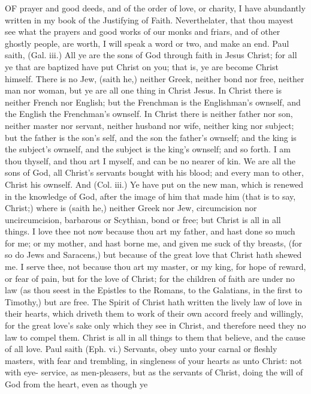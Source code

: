 OF prayer and good deeds, and of the order of love, or 
charity, I have abundantly written in my book of the 
Justifying of Faith. Neverthelater, that thou mayest see 
what the prayers and good works of our monks and friars, 
and of other ghostly people, are worth, I will speak a 
word or two, and make an end. Paul saith, (Gal. iii.) 
All ye are the sons of God through faith in Jesus Christ; 
for all ye that are baptized have put Christ on you; that 
is, ye are become Christ himself. There is no Jew, (saith 
he,) neither Greek, neither bond nor free, neither man nor 
woman, but ye are all one thing in Christ Jesus. In Christ 
there is neither French nor English; but the Frenchman 
is the Englishman's ownself, and the English the Frenchman's
ownself. In Christ there is neither father nor son, 
neither master nor servant, neither husband nor wife, 
neither king nor subject; but the father is the son's self, 
and the son the father's ownself; and the king is the subject's
ownself, and the subject is the king's ownself; and 
so forth. I am thou thyself, and thou art I myself, and can 
be no nearer of kin. We are all the sons of God, all 
Christ's servants bought with his blood; and every man 
to other, Christ his ownself. And (Col. iii.) Ye have put 
on the new man, which is renewed in the knowledge of 
God, after the image of him that made him (that is to say, 
Christ;) where is (saith he,) neither Greek nor Jew, circumcision
nor uncircumcision, barbarous or Scythian, bond 
or free; but Christ is all in all things. I love thee not 
now because thou art my father, and hast done so much 
for me; or my mother, and hast borne me, and given me
suck of thy breasts, (for so do Jews and Saracens,) but 
because of the great love that Christ hath shewed me. I 
serve thee, not because thou art my master, or my king, 
for hope of reward, or fear of pain, but for the love of 
Christ; for the children of faith are under no law (as 
thou seest in the Epistles to the Romans, to the Galatians, 
in the first to Timothy,) but are free. The Spirit of Christ 
hath written the lively law of love in their hearts, which 
driveth them to work of their own accord freely and willingly,
for the great love's sake only which they see in 
Christ, and therefore need they no law to compel them. 
Christ is all in all things to them that believe, and the cause 
of all love. Paul saith (Eph. vi.) Servants, obey unto 
your carnal or fleshly masters, with fear and trembling, in 
singleness of your hearts as unto Christ: not with eye- 
service, as men-pleasers, but as the servants of Christ, 
doing the will of God from the heart, even as though ye 
